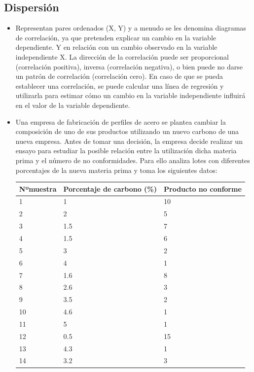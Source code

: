 \documentclass{article}
\theoremstyle{mytheoremstyle}
\theoremstyle{mytheoremstyle}
\theoremstyle{myproblemstyle}
\begin{document}
\begin{enumerate}
\begin{itemize}
		\section{Dispersión}
		\begin{itemize}
			\item Representan pares ordenados (X, Y) y a menudo se les denomina diagramas de correlación, ya que
			pretenden explicar un cambio en la variable dependiente. Y en relación con un cambio observado en la
			variable independiente X.\newline
			La dirección de la correlación puede ser proporcional (correlación positiva), inversa (correlación
			negativa), o bien puede no darse un patrón de correlación (correlación cero). En caso de que se pueda
			establecer una correlación, se puede calcular una línea de regresión y utilizarla para estimar cómo un
			cambio en la variable independiente influirá en el valor de la variable dependiente.
			\item Una empresa de fabricación de perfiles de acero se plantea cambiar la composición de uno de sus productos utilizando un nuevo carbono de una nueva empresa. Antes de tomar una decisión, la empresa decide realizar un ensayo para estudiar la posible relación entre la utilización dicha materia prima y el número de no conformidades. Para ello analiza lotes con diferentes porcentajes de la nueva materia prima y toma los siguientes datos:
			\begin{table}[H]
				\centering
				\begin{tabular}{|l|l|l|}
				\hline
					Nºmuestra & Porcentaje de carbono (\%) & Producto no conforme \\ \hline
					1 & 1 & 10 \\ \hline
					2 & 2 & 5 \\ \hline
					3 & 1.5 & 7 \\ \hline
					4 & 1.5 & 6 \\ \hline
					5 & 3 & 2 \\ \hline
					6 & 4 & 1 \\ \hline
					7 & 1.6 & 8 \\ \hline
					8 & 2.6 & 3 \\ \hline
					9 & 3.5 & 2 \\ \hline
					10 & 4.6 & 1 \\ \hline
					11 & 5 & 1 \\ \hline
					12 & 0.5 & 15 \\ \hline
					13 & 4.3 & 1 \\ \hline
					14 & 3.2 & 3 \\ \hline

\end{tabular}
\end{table}
\end{itemize}
\end{itemize}
\end{enumerate}
\end{document}
